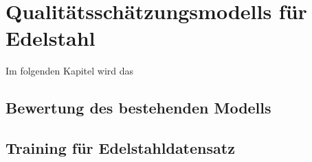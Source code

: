 \chapter{Qualitätsschätzungsmodells für Edelstahl}

Im folgenden Kapitel wird das 

\section{Bewertung des bestehenden Modells}

\section{Training für Edelstahldatensatz}